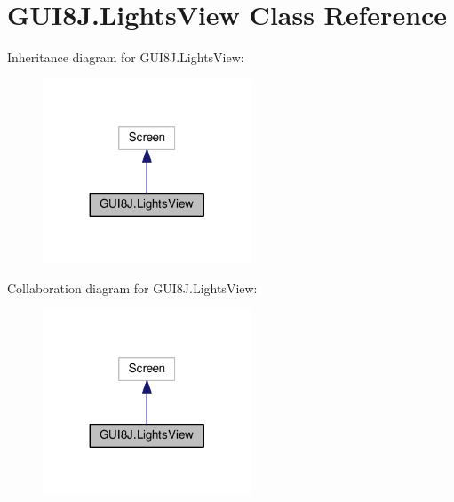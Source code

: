 \hypertarget{classGUI8J_1_1LightsView}{}\section{G\+U\+I8\+J.\+Lights\+View Class Reference}
\label{classGUI8J_1_1LightsView}


Inheritance diagram for G\+U\+I8\+J.\+Lights\+View\+:
\nopagebreak
\begin{figure}[H]
\begin{center}
\leavevmode
\includegraphics[width=176pt]{classGUI8J_1_1LightsView__inherit__graph}
\end{center}
\end{figure}


Collaboration diagram for G\+U\+I8\+J.\+Lights\+View\+:
\nopagebreak
\begin{figure}[H]
\begin{center}
\leavevmode
\includegraphics[width=176pt]{classGUI8J_1_1LightsView__coll__graph}
\end{center}
\end{figure}
